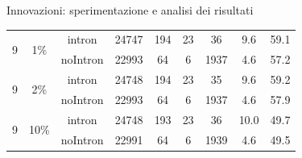 \documentclass{beamer}
\begin{document}
\begin{tframe}{Innovazioni: sperimentazione e analisi dei risultati}
\begin{center}
{\begin{tabular}{c|c|c|c|c|c|c|c|c}
      \hline

      \multirow{2}{*}{\small{9}}  &  \multirow{2}{*}{\small{1\%}} & \small{intron} & 24747 & 194 & 23 & 36 & 9.6 & 59.1\\
                                                                & & \small{noIntron} & 22993 & 64 & 6 & 1937 & 4.6 & 57.2\\
      \hline
      \multirow{2}{*}{\small{9}}  &  \multirow{2}{*}{\small{2\%}} & \small{intron} & 24748 & 194 & 23 & 35 & 9.6 & 59.2\\
                                                                & & \small{noIntron} & 22993 & 64 & 6 & 1937 & 4.6 & 57.9\\
      \hline
      \multirow{2}{*}{\small{9}}  &  \multirow{2}{*}{\small{10\%}} & \small{intron} & 24748 & 193 & 23 & 36 & 10.0 & 49.7\\
                                                                & & \small{noIntron} & 22991 & 64 & 6 & 1939 & 4.6 & 49.5\\
      \hline
    \end{tabular}}
  \end{center}
\end{tframe}


      
\end{document}
